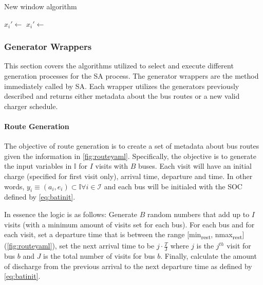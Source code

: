 \documentclass[11pt,a4paper,final]{article}
\newcommand{\I}{\mathbb{I}}                 %
\newcommand{\Sol}{\mathbb{S}}               %
\newcommand{\Iset}{\mathcal{I}}             %
\begin{document}
\begin{algorithm}[H]
\caption{New window algorithm}
    \LinesNumbered
    \KwIn{$\Sol$}
    \KwOut{$\I$}

    \Begin
    {

        $x_i' \leftarrow$  
        $x_i' \leftarrow$  

    }
\label{alg:new-window}
\end{algorithm}

\subsubsection{Generator Wrappers}
\label{generator-wrappers}
This section covers the algorithms utilized to select and execute different generation processes for the SA process. The
generator wrappers are the method immediately called by SA. Each wrapper utilizes the generators previously described
and returns either metadata about the bus routes or a new valid charger schedule.

\paragraph{Route Generation}
\label{sec:route-gen}
The objective of route generation is to create a set of metadata about bus routes given the information in
\ref{fig:routeyaml}. Specifically, the objective is to generate the input variables in \(\I\) for \(I\) visits with \(B\) buses.
Each visit will have an initial charge (specified for first visit only), arrival time, departure and time. In other
words, \(y_i \equiv (a_i, e_i) \subset \I \forall i \in \Iset\) and each bus will be initialed with the SOC defined by
\ref{eq:batinit}.

In essence the logic is as follows: Generate \(B\) random numbers that add up to \(I\) visits (with a minimum amount of
visits set for each bus). For each bus and for each visit, set a departure time that is between the range [min\textsubscript{rest},
nmax\textsubscript{rest}] (\ref{fig:routeyaml}), set the next arrival time to be \(j \cdot \frac{T}{\text{J}}\) where \(j\) is the \(j^{th}\) visit
for bus \(b\) and \(J\) is the total number of visits for bus \(b\). Finally, calculate the amount of discharge from the
previous arrival to the next departure time as defined by \ref{eq:batinit}.
\end{document}
